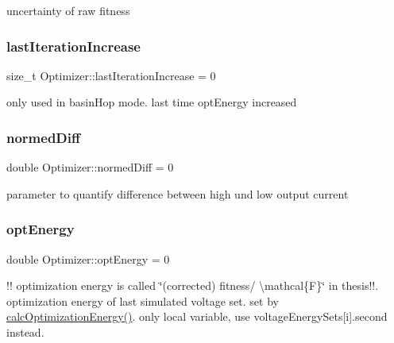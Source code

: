 uncertainty of raw fitness \mbox{\label{classOptimizer_a7b388654b13c174e265e81e949d5a69b}} 
\subsubsection{\texorpdfstring{last\+Iteration\+Increase}{lastIterationIncrease}}
{\footnotesize\ttfamily size\+\_\+t Optimizer\+::last\+Iteration\+Increase = 0\hspace{0.3cm}{\ttfamily [private]}}

only used in basin\+Hop mode. last time opt\+Energy increased \mbox{\label{classOptimizer_a30bba218ee4f03978b1b3358a8b3ea62}} 
\subsubsection{\texorpdfstring{normed\+Diff}{normedDiff}}
{\footnotesize\ttfamily double Optimizer\+::normed\+Diff = 0\hspace{0.3cm}{\ttfamily [private]}}

parameter to quantify difference between high und low output current \mbox{\label{classOptimizer_aea24c0bcb76dfd328f6f21b18046891d}} 
\subsubsection{\texorpdfstring{opt\+Energy}{optEnergy}}
{\footnotesize\ttfamily double Optimizer\+::opt\+Energy = 0\hspace{0.3cm}{\ttfamily [private]}}

!! optimization energy is called \char`\"{}(corrected) fitness/ \textbackslash{}mathcal\{\+F\}\char`\"{} in thesis!!. optimization energy of last simulated voltage set. set by \hyperlink{classOptimizer_a82f53be5481740bf2cc2ff921af38a51}{calc\+Optimization\+Energy()}. only local variable, use voltage\+Energy\+Sets\mbox{[}i\mbox{]}.second instead. \mbox{\label{classOptimizer_aba4673e21bc48603b1acd38cfb01b422}} 
